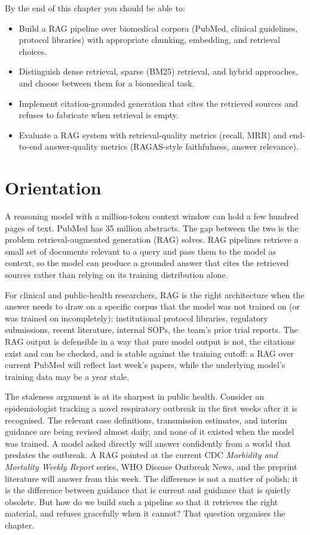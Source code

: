 \documentclass[
  letterpaper,
  11pt]{scrbook}
\newcounter{none} %
\providecommand{\tightlist}{%
  \setlength{\itemsep}{0pt}\setlength{\parskip}{0pt}}
\begin{document}
By the end of this chapter you should be able to:

\begin{itemize}
\tightlist
\item
  Build a RAG pipeline over biomedical corpora (PubMed, clinical
  guidelines, protocol libraries) with appropriate chunking, embedding,
  and retrieval choices.
\item
  Distinguish dense retrieval, sparse (BM25) retrieval, and hybrid
  approaches, and choose between them for a biomedical task.
\item
  Implement citation-grounded generation that cites the retrieved
  sources and refuses to fabricate when retrieval is empty.
\item
  Evaluate a RAG system with retrieval-quality metrics (recall, MRR) and
  end-to-end answer-quality metrics (RAGAS-style faithfulness, answer
  relevance).
\end{itemize}

\section{Orientation}\label{orientation-4}

A reasoning model with a million-token context window can hold a few
hundred pages of text. PubMed has 35 million abstracts. The gap between
the two is the problem retrieval-augmented generation (RAG) solves. RAG
pipelines retrieve a small set of documents relevant to a query and pass
them to the model as context, so the model can produce a grounded answer
that cites the retrieved sources rather than relying on its training
distribution alone.

For clinical and public-health researchers, RAG is the right
architecture when the answer needs to draw on a specific corpus that the
model was not trained on (or was trained on incompletely): institutional
protocol libraries, regulatory submissions, recent literature, internal
SOPs, the team's prior trial reports. The RAG output is defensible in a
way that pure model output is not, the citations exist and can be
checked, and is stable against the training cutoff: a RAG over current
PubMed will reflect last week's papers, while the underlying model's
training data may be a year stale.

The staleness argument is at its sharpest in public health. Consider an
epidemiologist tracking a novel respiratory outbreak in the first weeks
after it is recognised. The relevant case definitions, transmission
estimates, and interim guidance are being revised almost daily, and none
of it existed when the model was trained. A model asked directly will
answer confidently from a world that predates the outbreak. A RAG
pointed at the current CDC \emph{Morbidity and Mortality Weekly Report}
series, WHO Disease Outbreak News, and the preprint literature will
answer from this week. The difference is not a matter of polish; it is
the difference between guidance that is current and guidance that is
quietly obsolete. But how do we build such a pipeline so that it
retrieves the right material, and refuses gracefully when it cannot?
That question organises the chapter.
\end{document}
